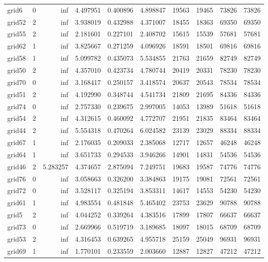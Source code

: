 \begin{longtable}{|l|r|r|r|r|r|r|r|r|r|}
grid6 & 0 & inf & 4.497951 & 0.400896 & 4.898847 & 19563 & 19465 & 73826 & 73826 \\
grid52 & 2 & inf & 3.938019 & 0.432988 & 4.371007 & 18455 & 18363 & 69350 & 69350 \\
grid55 & 2 & inf & 2.181601 & 0.227101 & 2.408702 & 15615 & 15539 & 57681 & 57681 \\
grid62 & 1 & inf & 3.825667 & 0.271259 & 4.096926 & 18591 & 18501 & 69816 & 69816 \\
grid58 & 1 & inf & 5.099782 & 0.435073 & 5.534855 & 21763 & 21659 & 82749 & 82749 \\
grid50 & 2 & inf & 4.357010 & 0.423734 & 4.780744 & 20419 & 20331 & 78230 & 78230 \\
grid70 & 0 & inf & 3.168417 & 0.250157 & 3.418574 & 20637 & 20543 & 78534 & 78534 \\
grid51 & 2 & inf & 4.192990 & 0.348744 & 4.541734 & 21809 & 21695 & 84336 & 84336 \\
grid74 & 0 & inf & 2.757330 & 0.239675 & 2.997005 & 14053 & 13989 & 51618 & 51618 \\
grid54 & 2 & inf & 4.312615 & 0.460092 & 4.772707 & 21951 & 21835 & 83464 & 83464 \\
grid44 & 2 & inf & 5.554318 & 0.470264 & 6.024582 & 23139 & 23029 & 88334 & 88334 \\
grid67 & 1 & inf & 2.176035 & 0.209033 & 2.385068 & 12717 & 12657 & 46248 & 46248 \\
grid64 & 1 & inf & 3.651733 & 0.294533 & 3.946266 & 14901 & 14831 & 54536 & 54536 \\
grid46 & 2 & 5.283257 & 4.374657 & 2.875094 & 7.249751 & 19683 & 19587 & 74776 & 74776 \\
grid76 & 0 & inf & 3.058663 & 0.326200 & 3.384863 & 19175 & 19081 & 72561 & 72561 \\
grid72 & 0 & inf & 3.528117 & 0.325194 & 3.853311 & 14617 & 14553 & 54230 & 54230 \\
grid61 & 1 & inf & 4.983554 & 0.481848 & 5.465402 & 23753 & 23629 & 90788 & 90788 \\
grid5 & 2 & inf & 4.044252 & 0.339264 & 4.383516 & 17899 & 17807 & 66637 & 66637 \\
grid73 & 0 & inf & 2.669966 & 0.519719 & 3.189685 & 18097 & 18015 & 68709 & 68709 \\
grid53 & 2 & inf & 4.316453 & 0.639265 & 4.955718 & 25159 & 25049 & 96931 & 96931 \\
grid69 & 1 & inf & 1.770101 & 0.233559 & 2.003660 & 12887 & 12827 & 47212 & 47212 \\

\end{longtable}
